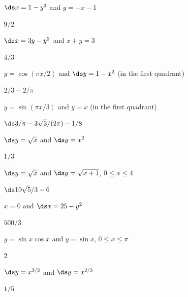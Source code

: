 \begin{multicols}{2}[]
\begin{enumialphparenastyle}
\begin{ex}
 $\ds x=1-y^2$ and $y=-x-1$
\begin{sol}
 $9/2$
\end{sol}
\end{ex}

\begin{ex}
 $\ds x=3y-y^2$ and $x+y=3$
\begin{sol}
 $4/3$
\end{sol}
\end{ex}

\begin{ex}
 $y=\cos(\pi x/2)$ and $\ds y=1- x^2$ (in the first quadrant)
\begin{sol}
 $2/3-2/\pi$
\end{sol}
\end{ex}

\begin{ex}
 $y=\sin(\pi x/3)$ and $y=x$ (in the first quadrant)
\begin{sol}
 $\ds 3/\pi - 3\sqrt3/(2\pi)-1/8$
\end{sol}
\end{ex}

\begin{ex}
 $\ds y=\sqrt{x}$ and $\ds y=x^2$
\begin{sol}
 $1/3$
\end{sol}
\end{ex}

\begin{ex}
 $\ds y=\sqrt x$ and $\ds y=\sqrt{x+1}$, $0\le x\le 4$
\begin{sol}
 $\ds 10\sqrt{5}/3-6$
\end{sol}
\end{ex}

\begin{ex}
 $x=0$ and $\ds x=25-y^2$
\begin{sol}
 $500/3$
\end{sol}
\end{ex}

\begin{ex}
 $y=\sin x\cos x$ and $y=\sin x$, $0\le x\le \pi$
\begin{sol}
 $2$
\end{sol}
\end{ex}

\begin{ex}
 $\ds y=x^{3/2}$ and $\ds y=x^{2/3}$
\begin{sol}
 $1/5$
\end{sol}
\end{ex}


\end{enumialphparenastyle}
\end{multicols}
